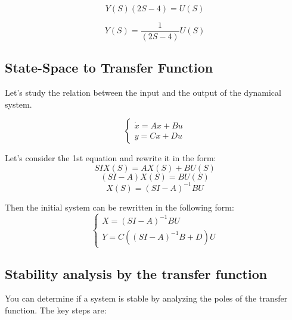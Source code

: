 \begin{equation}
    Y(S)(2S - 4) = U(S)
\end{equation}

\begin{equation}
    Y(S) = \frac{1}{(2S - 4)} U(S)
\end{equation}


\subsection{State-Space to Transfer Function}

Let's study the relation between the input and the output of the dynamical system. 

\[
\begin{cases}
    \dot x = Ax + Bu \\
    y = Cx + Du
\end{cases}
\] 

Let's consider the 1st equation and rewrite it in the form:
\[SI X(S) = AX(S) + BU(S)\]
\[(SI-A) X(S) = BU(S)\]
\[X(S) = (SI-A)^{-1}BU\]

Then the initial system can be rewritten in the following form:
\[
\begin{cases}
    X = (SI-A)^{-1}BU\\
    Y = C((SI-A)^{-1}B + D)U
\end{cases}
\]

\subsection{Stability analysis by the transfer function}

You can determine if a system is stable by analyzing the poles of the transfer function. The key steps are:

